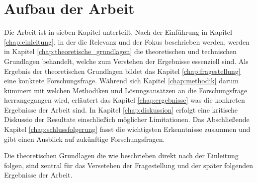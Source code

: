 \section{Aufbau der Arbeit}
\label{sec:aufbau_der_arbeit} Die Arbeit ist in sieben Kapitel unterteilt. Nach
der Einführung in Kapitel \ref{chap:einleitung}, in der die Relevanz und der Fokus
beschrieben werden, werden in Kapitel \ref{chap:theoretische_grundlagen} die
theoretischen und technischen Grundlagen behandelt, welche zum Verstehen der Ergebnisse
essenziell sind. Als Ergebnis der theoretischen Grundlagen bildet das Kapitel
\ref{chap:fragestellung} eine konkrete Forschungsfrage. Während sich Kapitel \ref{chap:methodik}
darum kümmert mit welchen Methodiken und Lösungsansätzen an die Forschungsfrage herrangegangen
wird, erläutert das Kapitel \ref{chap:ergebnisse} was die konkreten Ergebnisse
der Arbeit sind. In Kapitel \ref{chap:diskussion} erfolgt eine kritische Diskussio
der Resultate einschließich möglicher Limitationen. Das Abschließende Kapitel
\ref{chap:schlussfolgerung} fasst die wichtigsten Erkenntnisse zusammen und gibt
einen Ausblick auf zukünftige Forschungsfragen.

Die theoretischen Grundlagen die wie beschrieben direkt nach der Einleitung
folgen, sind zentral für das Versetehen der Fragestellung und der später folgenden
Ergebnisse der Arbeit.
